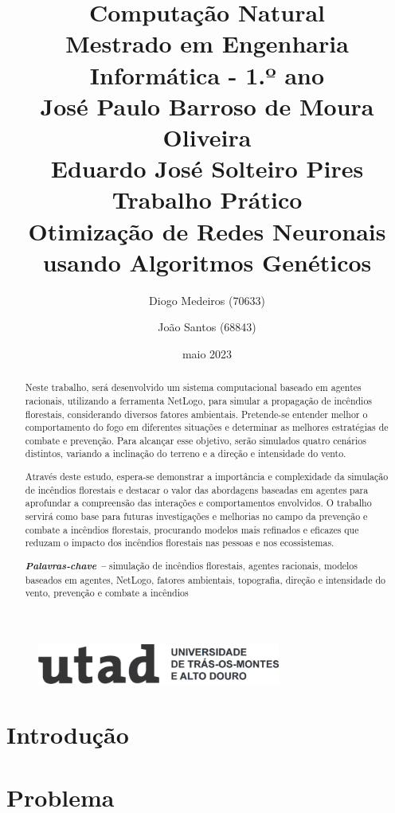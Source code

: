 \documentclass[a4paper, portuguese]{report}
\title{{\textbf{Computação Natural}}\\ Mestrado em Engenharia Informática - 1.º ano\\\vspace*{1cm} José Paulo Barroso de Moura Oliveira\\ Eduardo José Solteiro Pires\\\vspace*{3cm}\textbf{Trabalho Prático}\\\vspace*{0.5cm} Otimização de Redes Neuronais usando Algoritmos Genéticos \vspace*{1cm}}
\author{Diogo Medeiros (70633) \and João Santos (68843)}
\date{maio 2023}
\providecommand{\keywords}[1]
{
    \small
    \textbf{\textit{Palavras-chave --}} #1
}
\begin{document}
    \begin{figure}
        \includegraphics[width=8cm]{images/utad}
        \label{fig:utad_logo}
    \end{figure}
    \maketitle
    \begin{abstract}

        Neste trabalho, será desenvolvido um sistema computacional baseado em agentes racionais, utilizando a ferramenta NetLogo, para simular a propagação de incêndios florestais, considerando diversos fatores ambientais.
        Pretende-se entender melhor o comportamento do fogo em diferentes situações e determinar as melhores estratégias de combate e prevenção.
        Para alcançar esse objetivo, serão simulados quatro cenários distintos, variando a inclinação do terreno e a direção e intensidade do vento.

        Através deste estudo, espera-se demonstrar a importância e complexidade da simulação de incêndios florestais e destacar o valor das abordagens baseadas em agentes para aprofundar a compreensão das interações e comportamentos envolvidos.
        O trabalho servirá como base para futuras investigações e melhorias no campo da prevenção e combate a incêndios florestais, procurando modelos mais refinados e eficazes que reduzam o impacto dos incêndios florestais nas pessoas e nos ecossistemas.

        \keywords{simulação de incêndios florestais, agentes racionais, modelos baseados em agentes, NetLogo, fatores ambientais, topografia, direção e intensidade do vento, prevenção e combate a incêndios}

    \end{abstract}
    \tableofcontents
    \listoffigures
    \listoftables

    \chapter{Introdução}\label{ch:introduction}
    


    \chapter{Problema}\label{ch:problem}
\end{document}
